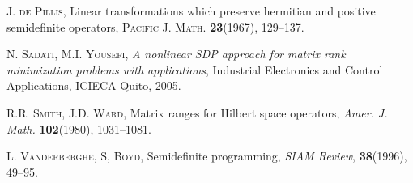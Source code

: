\documentclass[12pt]{amsart}
\theoremstyle{definition}
\begin{document}
\begin{thebibliography}{99}
 \textsc{J. de Pillis},
Linear transformations which preserve hermitian and positive semidefinite operators,
\textsc{Pacific J. Math.} \textbf{23}(1967), 129--137. 

 \textsc{N. Sadati, M.I. Yousefi}, {\it A nonlinear SDP approach 
for matrix rank minimization problems with applications}, Industrial Electronics and 
Control Applications, ICIECA Quito, 2005.

 \textsc{R.R. Smith, J.D. Ward}, Matrix ranges for Hilbert space
operators, \textit{Amer. J. Math.} \textbf{102}(1980), 1031--1081.

 \textsc{L. Vanderberghe, S, Boyd}, Semidefinite 
programming, \textit{SIAM Review}, \textbf{38}(1996), 49--95.

\end{thebibliography}
\end{document}
